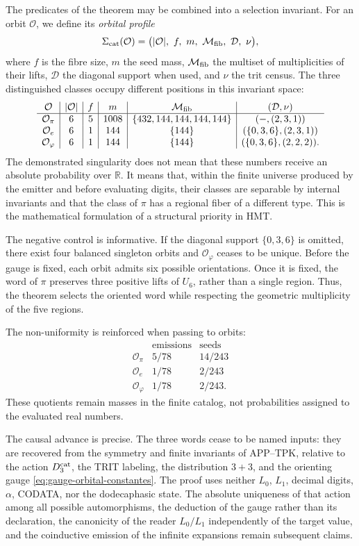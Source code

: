 The predicates of the theorem may be combined into a selection invariant.
For an orbit \(\mathcal O\), we define its \emph{orbital profile}
\[
 \Sigma_{\rm cat}(\mathcal O)=
 \bigl(
 |\mathcal O|,\ f,\ m,\ \mathcal M_{\rm fib},\
 \mathcal D,\ \nu
 \bigr),
\]
where \(f\) is the fibre size, \(m\) the seed mass,
\(\mathcal M_{\rm fib}\) the multiset of multiplicities of their
lifts, \(\mathcal D\) the diagonal support when used, and \(\nu\)
the trit census. The three distinguished classes occupy different positions
in this invariant space:
\[
\begin{array}{c|c|c|c|c|c}
\mathcal O&|\mathcal O|&f&m&\mathcal M_{\rm fib}&(\mathcal D,\nu)\\ \hline
\mathcal O_\pi&6&5&1008&\{432,144,144,144,144\}&(-,(2,3,1))\\
\mathcal O_e&6&1&144&\{144\}&(\{0,3,6\},(2,3,1))\\
\mathcal O_\varphi&6&1&144&\{144\}&(\{0,3,6\},(2,2,2)).
\end{array}
\]
The demonstrated singularity does not mean that these numbers receive an
absolute probability over \(\mathbb R\). It means that, within the finite universe
produced by the emitter and before evaluating digits, their classes are
separable by internal invariants and that the class of \(\pi\) has a
regional fiber of a different type. This is the mathematical formulation of a
structural priority in HMT\@.

The negative control is informative. If the diagonal support \(\{0,3,6\}\) is omitted, there exist four balanced singleton orbits and \(\mathcal O_\varphi\) ceases to be unique. Before the gauge is fixed, each orbit admits six possible orientations. Once it is fixed, the word of \(\pi\) preserves three positive lifts of \(U_6\), rather than a single region. Thus, the theorem selects the oriented word while respecting the geometric multiplicity of the five regions.

The non-uniformity is reinforced when passing to orbits:
\[
\begin{array}{c|cc}
&\text{emissions}&\text{seeds}\\ \hline
\mathcal O_\pi&5/78&14/243\\
\mathcal O_e&1/78&2/243\\
\mathcal O_\varphi&1/78&2/243.
\end{array}
\]
These quotients remain masses in the finite catalog, not probabilities
assigned to the evaluated real numbers.

The causal advance is precise. The three words cease to be named inputs: they are recovered from the symmetry and finite invariants of APP--TPK, relative to the action \(D_3^{\rm cat}\), the TRIT labeling, the distribution \(3+3\), and the orienting gauge \cref{eq:gauge-orbital-constantes}. The proof uses neither \(L_0\), \(L_1\), decimal digits, \(\alpha\), CODATA, nor the dodecaphasic state. The absolute uniqueness of that action among all possible automorphisms, the deduction of the gauge rather than its declaration, the canonicity of the reader \(L_0/L_1\) independently of the target value, and the coinductive emission of the infinite expansions remain subsequent claims.


